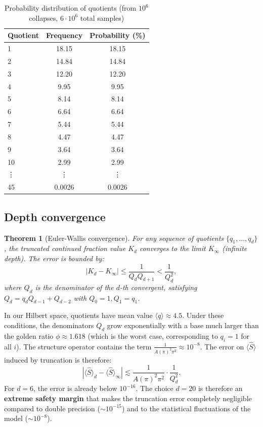 \documentclass[12pt]{article}
\newtheorem{theorem}{Theorem}
\begin{document}
\begin{table}[h]
\centering
\caption{Probability distribution of quotients (from $10^6$ collapses, $6\cdot10^6$ total samples)}
\label{tab:quotients}
\begin{tabular}{lcc}
\toprule
Quotient & Frequency & Probability (\%) \\
\midrule
1 & 18.15 & 18.15 \\
2 & 14.84 & 14.84 \\
3 & 12.20 & 12.20 \\
4 & 9.95 & 9.95 \\
5 & 8.14 & 8.14 \\
6 & 6.64 & 6.64 \\
7 & 5.44 & 5.44 \\
8 & 4.47 & 4.47 \\
9 & 3.64 & 3.64 \\
10 & 2.99 & 2.99 \\
\vdots & \vdots & \vdots \\
45 & 0.0026 & 0.0026 \\
\bottomrule
\end{tabular}
\end{table}

\subsection{Depth convergence}

\begin{theorem}[Euler-Wallis convergence]
For any sequence of quotients $\{q_1,\dots,q_d\}$, the truncated continued fraction value $K_d$ converges to the limit $K_\infty$ (infinite depth). The error is bounded by:
\[
|K_d - K_\infty| \leq \frac{1}{Q_d Q_{d+1}} < \frac{1}{Q_d^2},
\]
where $Q_d$ is the denominator of the $d$-th convergent, satisfying $Q_d = q_d Q_{d-1} + Q_{d-2}$ with $Q_0 = 1, Q_1 = q_1$.
\end{theorem}

In our Hilbert space, quotients have mean value $\langle q \rangle \approx 4.5$. Under these conditions, the denominators $Q_d$ grow exponentially with a base much larger than the golden ratio $\phi \approx 1.618$ (which is the worst case, corresponding to $q_i=1$ for all $i$). The structure operator contains the term $\frac{1}{A(\pi)^2 \pi^2} \approx 10^{-8}$. The error on $\langle \hat S \rangle$ induced by truncation is therefore:
\[
|\langle \hat S \rangle_d - \langle \hat S \rangle_\infty| \lesssim \frac{1}{A(\pi)^2 \pi^2} \cdot \frac{1}{Q_d^2}.
\]
For $d=6$, the error is already below $10^{-16}$. The choice $d=20$ is therefore an \textbf{extreme safety margin} that makes the truncation error completely negligible compared to double precision ($\sim 10^{-15}$) and to the statistical fluctuations of the model ($\sim 10^{-8}$).
\end{document}
